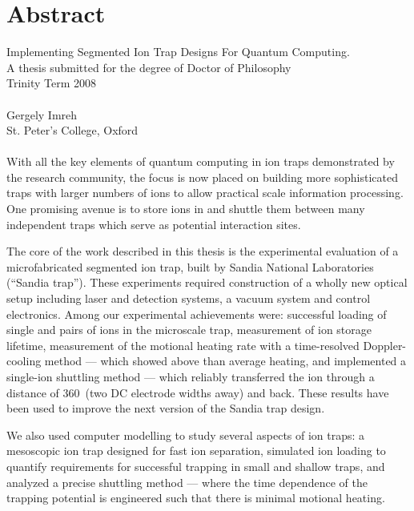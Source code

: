 \chapter*{Abstract}

Implementing Segmented Ion Trap Designs For Quantum Computing. \\
A thesis submitted for the degree of Doctor of Philosophy \\
Trinity Term 2008 \\
\\
Gergely Imreh \\
St. Peter's College, Oxford \\
\\

With all the key elements of quantum computing in ion traps demonstrated by the research community, the focus is now placed on building more sophisticated traps with larger numbers of ions to allow practical scale information processing. One promising avenue is to store ions in and shuttle them between many independent traps which serve as potential interaction sites.

The core of the work described in this thesis is the experimental evaluation of a microfabricated segmented ion trap, built by Sandia National Laboratories (``Sandia trap''). These experiments required construction of a wholly new optical setup including laser and detection systems, a vacuum system and control electronics. Among our experimental achievements were: successful loading of single and pairs of ions in the microscale trap, measurement of ion storage lifetime, measurement of the motional heating rate with a time-resolved Doppler-cooling method --- which showed above than average heating, and implemented a single-ion shuttling method --- which reliably transferred the ion through a distance of 360\um\, (two DC electrode widths away) and back. These results have been used to improve the next version of the Sandia trap design.

We also used computer modelling to study several aspects of ion traps: a mesoscopic ion trap designed for fast ion separation, simulated ion loading to quantify requirements for successful trapping in small and shallow traps, and analyzed a precise shuttling method --- where the time dependence of the trapping potential is engineered such that there is minimal motional heating.

